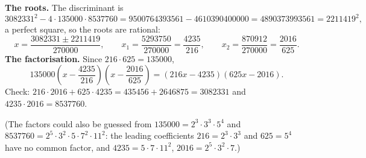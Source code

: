 \textbf{The roots.} The discriminant is
\[3082331^2-4\cdot135000\cdot8537760=9500764393561-4610390400000=4890373993561=2211419^2,\]
a perfect square, so the roots are rational:
\[x=\dfrac{3082331\pm2211419}{270000},\qquad x_1=\dfrac{5293750}{270000}=\dfrac{4235}{216},\qquad x_2=\dfrac{870912}{270000}=\dfrac{2016}{625}.\]
\textbf{The factorisation.} Since $216\cdot625=135000$,
\[135000\left(x-\dfrac{4235}{216}\right)\left(x-\dfrac{2016}{625}\right)=\boxed{(216x-4235)(625x-2016)}.\]
Check: $216\cdot2016+625\cdot4235=435456+2646875=3082331$ and $4235\cdot2016=8537760$.

(The factors could also be guessed from $135000=2^3\cdot3^3\cdot5^4$ and $8537760=2^5\cdot3^2\cdot5\cdot7^2\cdot11^2$: the leading coefficients $216=2^3\cdot3^3$ and $625=5^4$ have no common factor, and $4235=5\cdot7\cdot11^2$, $2016=2^5\cdot3^2\cdot7$.)
